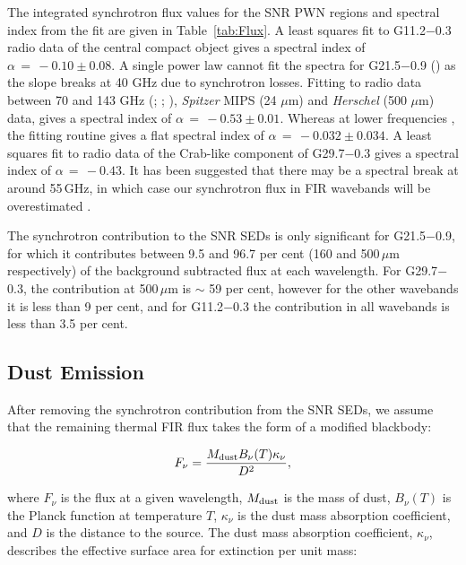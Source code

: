 \documentclass[fleqn,usenatbib]{mnras}
\begin{document}
{The integrated synchrotron flux values for the SNR PWN regions and spectral index from the fit are given in Table~\ref{tab:Flux}. A least squares fit to G11.2$-$0.3 radio data \citep{Kothes2001} of the central compact object gives a spectral index of $\alpha\,=\,-0.10 \pm 0.08 $.
A single power law cannot fit the spectra for G21.5$-$0.9 (\citealp{Salter1989ApJ}) as the slope breaks at 40 GHz due to synchrotron losses. Fitting to radio data between 70 and 143 GHz (\citealp{Salter1989ApJ}; \citealp{Salter1989AA}; \citealp{Planck2016mic}),  \textit{Spitzer}  MIPS (24 $\mu$m) and \textit{Herschel} (500 $\mu$m) data, gives a spectral index of $\alpha\,=\,-0.53 \pm 0.01$. Whereas at lower frequencies \citep{Morsi1987, Bietenholz2008}, the fitting routine gives a flat spectral index of $\alpha\,=\,-0.032 \pm 0.034$.
A least squares fit to radio data of the Crab-like component of G29.7$-$0.3 \citep{Salter1989ApJ} gives a spectral index of $\alpha\,=\,-0.43$. It has been suggested that there may be a spectral break at around 55\,GHz, in which case our synchrotron flux in FIR wavebands will be overestimated \citep{Bock2005}.

The synchrotron contribution to the SNR SEDs is only significant for G21.5$-$0.9, for which it contributes between 9.5 and 96.7 per cent (160 and 500\,$\mu$m respectively) of the background subtracted flux at each wavelength. For G29.7$-$0.3, the contribution at 500\,$\mu$m is $\sim$ 59 per cent, however for the other wavebands it is less than 9 per cent, and for G11.2$-$0.3 the contribution in all wavebands is less than 3.5 per cent.

\subsection{Dust Emission} \label{DustEmission}
After removing the synchrotron contribution from the SNR SEDs, we assume that the remaining thermal FIR flux takes the form of a modified blackbody:

\begin{equation} \label{eqn:Greybody}
	\centering
	F_\nu = \frac{M_{\rm dust} B_\nu (T) \kappa_\nu}{D^2},
\end{equation}

where $F_\nu $ is the flux at a given wavelength, $M_{\rm dust}$ is the mass of dust, $B_\nu (T)$ is the Planck function at temperature $T$, $\kappa_\nu$ is the dust mass absorption coefficient, and $D$ is the distance to the source. The dust mass absorption coefficient, $\kappa_\nu$, describes the effective surface area for extinction per unit mass:

}
\end{document}
